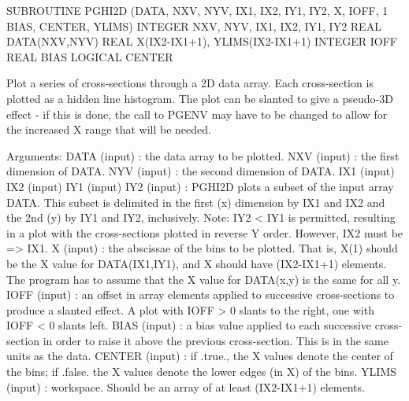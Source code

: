 {\eightpoint\begintt
      SUBROUTINE PGHI2D (DATA, NXV, NYV, IX1, IX2, IY1, IY2, X, IOFF,
     1                   BIAS, CENTER, YLIMS)
      INTEGER NXV, NYV, IX1, IX2, IY1, IY2
      REAL    DATA(NXV,NYV)
      REAL    X(IX2-IX1+1), YLIMS(IX2-IX1+1)
      INTEGER IOFF
      REAL    BIAS
      LOGICAL CENTER
 
Plot a series of cross-sections through a 2D data array.
Each cross-section is plotted as a hidden line histogram.  The plot
can be slanted to give a pseudo-3D effect - if this is done, the
call to PGENV may have to be changed to allow for the increased X
range that will be needed.
 
Arguments:
 DATA   (input)  : the data array to be plotted.
 NXV    (input)  : the first dimension of DATA.
 NYV    (input)  : the second dimension of DATA.
 IX1    (input)
 IX2    (input)
 IY1    (input)
 IY2    (input)  : PGHI2D plots a subset of the input array DATA.
                   This subset is delimited in the first (x)
                   dimension by IX1 and IX2 and the 2nd (y) by IY1
                   and IY2, inclusively. Note: IY2 < IY1 is
                   permitted, resulting in a plot with the
                   cross-sections plotted in reverse Y order.
                   However, IX2 must be => IX1.
 X      (input)  : the abscissae of the bins to be plotted. That is,
                   X(1) should be the X value for DATA(IX1,IY1), and
                   X should have (IX2-IX1+1) elements.  The program
                   has to assume that the X value for DATA(x,y) is
                   the same for all y.
 IOFF   (input)  : an offset in array elements applied to successive
                   cross-sections to produce a slanted effect.  A
                   plot with IOFF > 0 slants to the right, one with
                   IOFF < 0 slants left.
 BIAS   (input)  : a bias value applied to each successive cross-
                   section in order to raise it above the previous
                   cross-section.  This is in the same units as the
                   data.
 CENTER (input)  : if .true., the X values denote the center of the
                   bins; if .false. the X values denote the lower
                   edges (in X) of the bins.
 YLIMS  (input)  : workspace.  Should be an array of at least
                   (IX2-IX1+1) elements.
\endtt}

